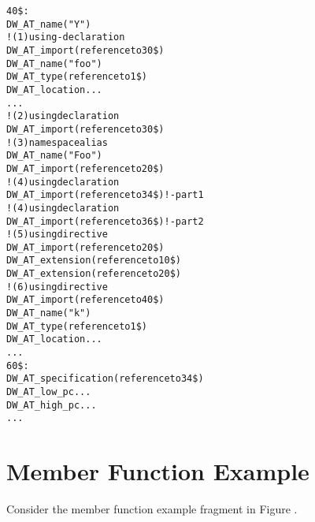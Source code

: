\begin{alltt}
40\$: 
        DW\-\_AT\-\_name("Y")
            ! (1) using-declaration
            DW\-\_AT\-\_import(reference to 30\$)
            DW\-\_AT\-\_name("foo")
            DW\-\_AT\-\_type(reference to 1\$)
            DW\-\_AT\-\_location ...
            ...
            ! (2) using declaration
        DW\-\_AT\-\_import(reference to 30\$)
            ! (3) namespace alias
            DW\-\_AT\-\_name("Foo")
            DW\-\_AT\-\_import(reference to 20\$)
            ! (4) using declaration
            DW\-\_AT\-\_import(reference to 34\$) ! - part 1
            ! (4) using declaration
            DW\-\_AT\-\_import(reference to 36\$) !  - part 2
                 ! (5) using directive
            DW\-\_AT\-\_import(reference to 20\$)
            DW\-\_AT\-\_extension(reference to 10\$)
                DW\-\_AT\-\_extension(reference to 20\$)
                 ! (6) using directive
                    DW\-\_AT\-\_import(reference to 40\$)
                    DW\-\_AT\-\_name("k")
                    DW\-\_AT\-\_type(reference to 1\$)
                    DW\-\_AT\-\_location ...
                    ...
60\$: 
        DW\-\_AT\-\_specification(reference to 34\$)
        DW\-\_AT\-\_low\-\_pc ...
        DW\-\_AT\-\_high\-\_pc ...
        ...
\end{alltt}

\section{Member Function Example}
\label{app:memberfunctionexample}

Consider the member function example fragment in 
Figure .

